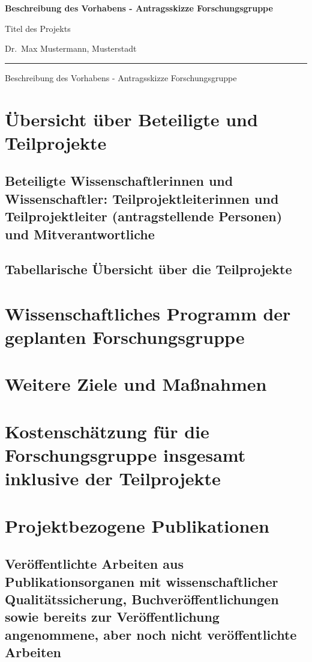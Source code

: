 \documentclass{scrartcl}
\newcommand{\spokesperson}{Dr.\ Max Mustermann, Musterstadt}
\newcommand{\project}{Titel des Projekts}
\begin{document}
{\raggedright{} \normalsize \bfseries
	Beschreibung des Vorhabens - Antragsskizze Forschungsgruppe \par
    \project{} \par
    \spokesperson{} \par
	\rule{\textwidth}{0.5pt} \par
	Beschreibung des Vorhabens - Antragsskizze Forschungsgruppe
}

\section{Übersicht über Beteiligte und Teilprojekte}

\subsection{Beteiligte Wissenschaftlerinnen und Wissenschaftler: Teilprojektleiterinnen und Teilprojektleiter (antragstellende Personen) und Mitverantwortliche}

\subsection{Tabellarische Übersicht über die Teilprojekte}


\section{Wissenschaftliches Programm der geplanten Forschungsgruppe}


\section{Weitere Ziele und Maßnahmen}


\section{Kostenschätzung für die Forschungsgruppe insgesamt inklusive der Teilprojekte}

\section{Projektbezogene Publikationen}

\subsection{Veröffentlichte Arbeiten aus Publikationsorganen mit wissenschaftlicher Qualitätssicherung, Buchveröffentlichungen sowie bereits zur Veröffentlichung angenommene, aber noch nicht veröffentlichte Arbeiten}
\printbibliography[category=reviewed, heading=none]
\end{document}
